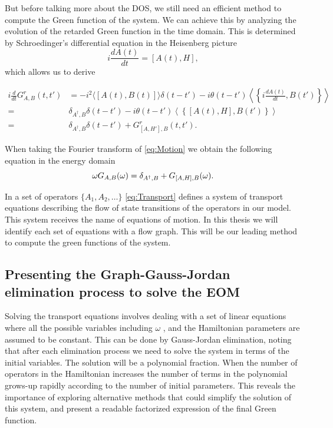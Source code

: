 But before talking more about the DOS,  we still  need an efficient method to compute the Green function of the system. We can achieve this by analyzing  the evolution of the retarded Green function in the time domain. This is determined by Schroedinger's differential equation
in the Heisenberg picture 
\begin{equation}
i\frac{dA(t)}{dt} =\left[A(t),H\right],
\end{equation}
\noindent which allows us to derive

\begin{align}
i\frac{d}{dt}G_{A,B}^{r}\left(t,t'\right)&=-i^{2}\langle\left[A(t),B(t)\right]\rangle\delta\left(t-t'\right)-i\theta\left(t-t'\right){\displaystyle \left\langle \left\{ i\frac{dA(t)}{dt},B(t')\right\} \right\rangle } \\
=& \delta_{A^{\dagger},B}\delta\left(t-t'\right)-i\theta\left(t-t'\right)\left\langle \left\{ \left[A(t),H\right],B(t')\right\} \right\rangle  \\
= & \delta_{A^{\dagger},B}\delta\left(t-t'\right)+G_{\left[A,H'\right],B}^{r}\left(t,t'\right). \label{eq:Motion}
\end{align}

When taking the Fourier transform of \eqref{eq:Motion} we obtain the following equation in the energy domain  
\begin{equation}
    \omega G_{A,B}(\omega)=\delta_{A^{\dagger},B}+G_{\left[A,H\right],B}(\omega).
    \label{eq:Transport}
\end{equation}


\noindent In a set of operators $\{A_1, A_2, \ldots \}$ \eqref{eq:Transport} defines a system of transport equations describing the flow of state transitions of the operators in our model. This system receives the  name of equations of motion. In this thesis we will identify each set of equations with a flow graph. This will be our leading method to compute the green functions of the system.


\subsection{Presenting the Graph-Gauss-Jordan elimination process to solve the EOM \label{sec:GraphMethod}}

Solving the transport equations involves dealing with a set of linear equations where all the possible variables including  $\omega$ , and the Hamiltonian parameters are assumed to be constant.  This can be done by  Gauss-Jordan elimination, noting that after each elimination process we need to solve the system in terms of the initial  variables. The solution  will be a polynomial fraction.  When the number of operators in the Hamiltonian increases the number of terms in the polynomial grows-up rapidly according to the number of initial parameters. This reveals the importance of exploring alternative methods that could simplify the solution of this system, and present a readable factorized expression of the final Green function. 

